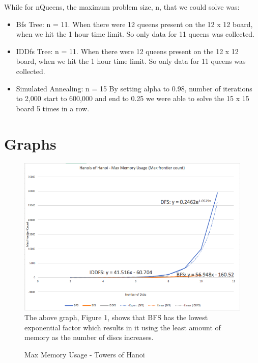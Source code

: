 \documentclass{article}
\begin{document}
While for nQueens, the maximum problem size, n, that we could solve was: 
\begin{itemize}

\item Bfs Tree: n = 11. When there were 12 queens present on the 12 x 12 board, when we hit the 1 hour time limit. So only data for 11 queens was collected. 

\item IDDfs Tree: n = 11. When there were 12 queens present on the 12 x 12 board, when we hit the 1 hour time limit. So only data for 11 queens was collected. 

\item Simulated Annealing: n = 15 By setting alpha to 0.98, number of iterations to 2,000 start to 600,000 and end to 0.25 we were able to solve the 15 x 15 board 5 times in a row.
\end{itemize}
\newpage
\section{Graphs}
\begin{figure}[!htb]
\caption{Max Memory Usage - Towers of Hanoi}
\includegraphics[width=\textwidth]{MemAll.png}
The above graph, Figure 1, shows that BFS has the lowest exponential factor which results in it using the least amount of memory as the number of discs increases.
\end{figure}
\end{document}
